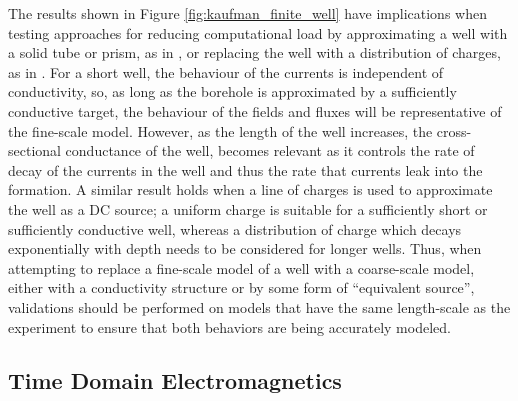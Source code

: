 The results shown in Figure \ref{fig:kaufman_finite_well} have implications when testing approaches for reducing computational load by approximating a well with a solid tube or prism, as in \cite{Um2015}, or replacing the well with a distribution of charges, as in \cite{Weiss2016}. For a short well, the behaviour of the currents is independent of conductivity, so, as long as the borehole is approximated by a sufficiently conductive target, the behaviour of the fields and fluxes will be representative of the fine-scale model. However, as the length of the well increases, the cross-sectional conductance of the well, becomes relevant as it controls the rate of decay of the currents in the well and thus the rate that currents leak into the formation. A similar result holds when a line of charges is used to approximate the well as a DC source; a uniform charge is suitable for a sufficiently short or sufficiently conductive well, whereas a distribution of charge which decays exponentially with depth needs to be considered for longer wells. Thus, when attempting to replace a fine-scale model of a well with a coarse-scale model, either with a conductivity structure or by some form of ``equivalent source'', validations should be performed on models that have the same length-scale as the experiment to ensure that both behaviors are being accurately modeled.



\subsection{Time Domain Electromagnetics}
\label{sec:TDEM}

